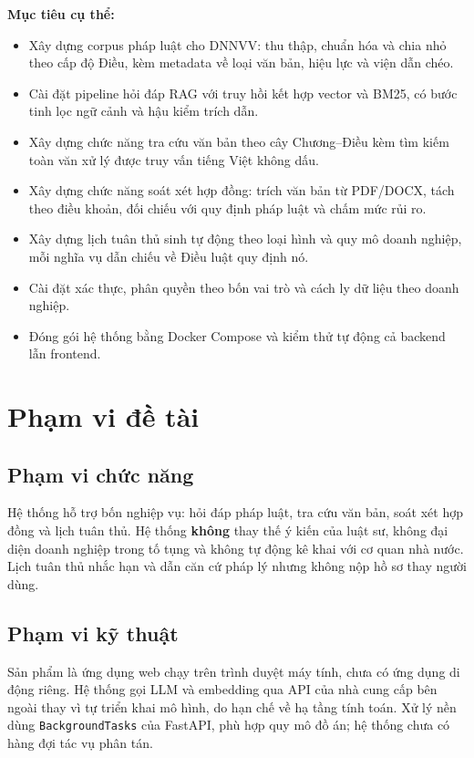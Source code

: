 \documentclass[12pt,a4paper]{report}
\numberwithin{equation}{chapter}
\numberwithin{figure}{chapter}
\numberwithin{table}{chapter}
\begin{document}
\textbf{Mục tiêu cụ thể:}
\begin{itemize}
    \item Xây dựng corpus pháp luật cho DNNVV: thu thập, chuẩn hóa và chia nhỏ
    theo cấp độ Điều, kèm metadata về loại văn bản, hiệu lực và viện dẫn chéo.
    \item Cài đặt pipeline hỏi đáp RAG với truy hồi kết hợp vector và BM25, có
    bước tinh lọc ngữ cảnh và hậu kiểm trích dẫn.
    \item Xây dựng chức năng tra cứu văn bản theo cây Chương--Điều kèm tìm kiếm
    toàn văn xử lý được truy vấn tiếng Việt không dấu.
    \item Xây dựng chức năng soát xét hợp đồng: trích văn bản từ PDF/DOCX, tách
    theo điều khoản, đối chiếu với quy định pháp luật và chấm mức rủi ro.
    \item Xây dựng lịch tuân thủ sinh tự động theo loại hình và quy mô doanh
    nghiệp, mỗi nghĩa vụ dẫn chiếu về Điều luật quy định nó.
    \item Cài đặt xác thực, phân quyền theo bốn vai trò và cách ly dữ liệu theo
    doanh nghiệp.
    \item Đóng gói hệ thống bằng Docker Compose và kiểm thử tự động cả backend
    lẫn frontend.
\end{itemize}

\section{Phạm vi đề tài}

\subsection{Phạm vi chức năng}
Hệ thống hỗ trợ bốn nghiệp vụ: hỏi đáp pháp luật, tra cứu văn bản, soát xét hợp
đồng và lịch tuân thủ. Hệ thống \textbf{không} thay thế ý kiến của luật sư, không
đại diện doanh nghiệp trong tố tụng và không tự động kê khai với cơ quan nhà
nước. Lịch tuân thủ nhắc hạn và dẫn căn cứ pháp lý nhưng không nộp hồ sơ thay
người dùng.

\subsection{Phạm vi kỹ thuật}
Sản phẩm là ứng dụng web chạy trên trình duyệt máy tính, chưa có ứng dụng di động
riêng. Hệ thống gọi LLM và embedding qua API của nhà cung cấp bên ngoài thay vì
tự triển khai mô hình, do hạn chế về hạ tầng tính toán. Xử lý nền dùng
\texttt{BackgroundTasks} của FastAPI, phù hợp quy mô đồ án; hệ thống chưa có hàng
đợi tác vụ phân tán.
\end{document}
